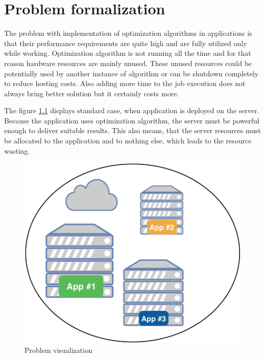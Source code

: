 \chapter{Problem formalization}\label{ch:problem-formalization}

The problem with implementation of optimization algorithms in applications is that their
performance requirements are quite high and are fully utilized only while working.
Optimization algorithm is not running all the time and for that reason hardware resources are mainly unused.
These unused resources could be potentially used by another instance of algorithm
or can be shutdown completely to reduce hosting costs.
Also adding more time to the job execution does not always bring better solution
but it certainly costs more.

The figure \ref{fig:problem-scheme} displays standard case,
when application is deployed on the server.
Because the application uses optimization algorithm, 
the server must be powerful enough to deliver suitable results.
This also means,
that the server resources must be allocated to the application and to nothing else,
which leads to the resource wasting.
\begin{figure}[ht] 
    \includegraphics[scale=0.7]{i_problem_scheme_without.pdf} 
    \centering
    \caption{Problem visualization}
    \label{fig:problem-scheme}
\end{figure}

